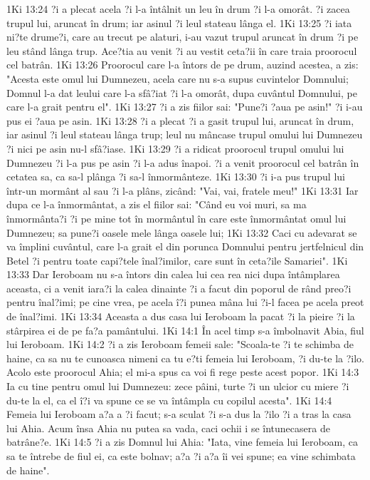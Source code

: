 1Ki 13:24  ?i a plecat acela ?i l-a întâlnit un leu în drum ?i l-a omorât. ?i zacea trupul lui, aruncat în drum; iar asinul ?i leul stateau lânga el.
1Ki 13:25  ?i iata ni?te drume?i, care au trecut pe alaturi, i-au vazut trupul aruncat în drum ?i pe leu stând lânga trup. Ace?tia au venit ?i au vestit ceta?ii în care traia proorocul cel batrân.
1Ki 13:26  Proorocul care l-a întors de pe drum, auzind acestea, a zis: "Acesta este omul lui Dumnezeu, acela care nu s-a supus cuvintelor Domnului; Domnul l-a dat leului care l-a sfâ?iat ?i l-a omorât, dupa cuvântul Domnului, pe care l-a grait pentru el".
1Ki 13:27  ?i a zis fiilor sai: "Pune?i ?aua pe asin!" ?i i-au pus ei ?aua pe asin.
1Ki 13:28  ?i a plecat ?i a gasit trupul lui, aruncat în drum, iar asinul ?i leul stateau lânga trup; leul nu mâncase trupul omului lui Dumnezeu ?i nici pe asin nu-l sfâ?iase.
1Ki 13:29  ?i a ridicat proorocul trupul omului lui Dumnezeu ?i l-a pus pe asin ?i l-a adus înapoi. ?i a venit proorocul cel batrân în cetatea sa, ca sa-l plânga ?i sa-l înmormânteze.
1Ki 13:30  ?i i-a pus trupul lui într-un mormânt al sau ?i l-a plâns, zicând: "Vai, vai, fratele meu!"
1Ki 13:31  Iar dupa ce l-a înmormântat, a zis el fiilor sai: "Când eu voi muri, sa ma înmormânta?i ?i pe mine tot în mormântul în care este înmormântat omul lui Dumnezeu; sa pune?i oasele mele lânga oasele lui;
1Ki 13:32  Caci cu adevarat se va împlini cuvântul, care l-a grait el din porunca Domnului pentru jertfelnicul din Betel ?i pentru toate capi?tele înal?imilor, care sunt în ceta?ile Samariei".
1Ki 13:33  Dar Ieroboam nu s-a întors din calea lui cea rea nici dupa întâmplarea aceasta, ci a venit iara?i la calea dinainte ?i a facut din poporul de rând preo?i pentru înal?imi; pe cine vrea, pe acela î?i punea mâna lui ?i-l facea pe acela preot de înal?imi.
1Ki 13:34  Aceasta a dus casa lui Ieroboam la pacat ?i la pieire ?i la stârpirea ei de pe fa?a pamântului.
1Ki 14:1  În acel timp s-a îmbolnavit Abia, fiul lui Ieroboam.
1Ki 14:2  ?i a zis Ieroboam femeii sale: "Scoala-te ?i te schimba de haine, ca sa nu te cunoasca nimeni ca tu e?ti femeia lui Ieroboam, ?i du-te la ?ilo. Acolo este proorocul Ahia; el mi-a spus ca voi fi rege peste acest popor.
1Ki 14:3  Ia cu tine pentru omul lui Dumnezeu: zece pâini, turte ?i un ulcior cu miere ?i du-te la el, ca el î?i va spune ce se va întâmpla cu copilul acesta".
1Ki 14:4  Femeia lui Ieroboam a?a a ?i facut; s-a sculat ?i s-a dus la ?ilo ?i a tras la casa lui Ahia. Acum însa Ahia nu putea sa vada, caci ochii i se întunecasera de batrâne?e.
1Ki 14:5  ?i a zis Domnul lui Ahia: "Iata, vine femeia lui Ieroboam, ca sa te întrebe de fiul ei, ca este bolnav; a?a ?i a?a îi vei spune; ea vine schimbata de haine".
